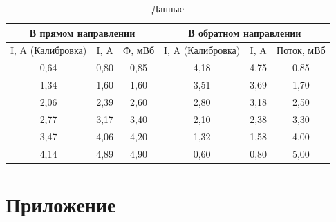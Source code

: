\documentclass[a4paper, 12pt]{article}
\begin{document}
\begin{table}[H]
	\centering
	\begin{tabular}{|ccc|ccc|}
	\hline
	\multicolumn{3}{|c|}{В прямом направлении}                                   & \multicolumn{3}{c|}{В обратном направлении}                                     \\ \hline
	\multicolumn{1}{|c|}{I, A (Калибровка)} & \multicolumn{1}{c|}{I, A} & Ф, мВб & \multicolumn{1}{c|}{I, A (Калибровка)} & \multicolumn{1}{c|}{I, A} & Поток, мВб \\ \hline
	\multicolumn{1}{|c|}{0,64}              & \multicolumn{1}{c|}{0,80} & 0,85   & \multicolumn{1}{c|}{4,18}              & \multicolumn{1}{c|}{4,75} & 0,85       \\ \hline
	\multicolumn{1}{|c|}{1,34}              & \multicolumn{1}{c|}{1,60} & 1,60   & \multicolumn{1}{c|}{3,51}              & \multicolumn{1}{c|}{3,69} & 1,70       \\ \hline
	\multicolumn{1}{|c|}{2,06}              & \multicolumn{1}{c|}{2,39} & 2,60   & \multicolumn{1}{c|}{2,80}              & \multicolumn{1}{c|}{3,18} & 2,50       \\ \hline
	\multicolumn{1}{|c|}{2,77}              & \multicolumn{1}{c|}{3,17} & 3,40   & \multicolumn{1}{c|}{2,10}              & \multicolumn{1}{c|}{2,38} & 3,30       \\ \hline
	\multicolumn{1}{|c|}{3,47}              & \multicolumn{1}{c|}{4,06} & 4,20   & \multicolumn{1}{c|}{1,32}              & \multicolumn{1}{c|}{1,58} & 4,00       \\ \hline
	\multicolumn{1}{|c|}{4,14}              & \multicolumn{1}{c|}{4,89} & 4,90   & \multicolumn{1}{c|}{0,60}              & \multicolumn{1}{c|}{0,80} & 5,00       \\ \hline
	\end{tabular}
	\caption{Данные}
	\label{tab:data_data}
	\end{table}

\section{Приложение}
\end{document}
